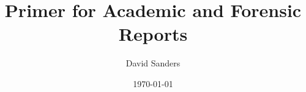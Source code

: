 \documentclass[12pt]{article}
\title{Primer for Academic and Forensic Reports}
\author{David Sanders}
\date{\today}
\begin{document}

\tableofcontents




\pagebreak
\listoffigures

\pagebreak
\listoflistings
\end{document}
